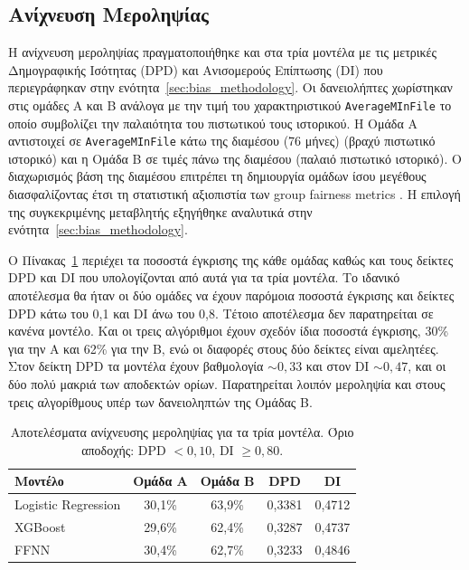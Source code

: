 \subsection{Ανίχνευση Μεροληψίας}
\label{subsec:bias_detection}

Η ανίχνευση μεροληψίας πραγματοποιήθηκε και στα τρία μοντέλα με τις μετρικές
Δημογραφικής Ισότητας (DPD) και Ανισομερούς Επίπτωσης (DI) που περιεγράφηκαν
στην ενότητα~\ref{sec:bias_methodology}. Οι δανειολήπτες χωρίστηκαν στις ομάδες Α και Β
ανάλογα με την τιμή του χαρακτηριστικού \texttt{AverageMInFile} το οποίο
συμβολίζει την παλαιότητα του πιστωτικού τους ιστορικού. Η Ομάδα Α αντιστοιχεί
σε \texttt{AverageMInFile} κάτω της διαμέσου (76 μήνες) (βραχύ πιστωτικό
ιστορικό) και η Ομάδα Β σε τιμές πάνω της διαμέσου (παλαιό πιστωτικό ιστορικό). Ο διαχωρισμός βάση της διαμέσου 
επιτρέπει τη δημιουργία ομάδων ίσου μεγέθους διασφαλίζοντας έτσι τη στατιστική αξιοπιστία των group fairness metrics \citep{barocas2019fairness}.
Η επιλογή της συγκεκριμένης μεταβλητής εξηγήθηκε αναλυτικά στην
ενότητα~\ref{sec:bias_methodology}.

Ο Πίνακας~\ref{tab:bias_results} περιέχει τα ποσοστά έγκρισης της κάθε ομάδας
καθώς και τους δείκτες DPD και DI που υπολογίζονται από αυτά για τα τρία μοντέλα.
Το ιδανικό αποτέλεσμα θα ήταν οι δύο ομάδες να έχουν παρόμοια ποσοστά έγκρισης
και δείκτες DPD κάτω του 0{,}1 και DI άνω του 0{,}8. Τέτοιο αποτέλεσμα δεν
παρατηρείται σε κανένα μοντέλο. Και οι τρεις αλγόριθμοι έχουν σχεδόν ίδια
ποσοστά έγκρισης, 30\% για την Α και 62\% για την Β, ενώ οι διαφορές στους
δύο δείκτες είναι αμελητέες. Στον δείκτη DPD τα μοντέλα έχουν βαθμολογία
${\sim}0{,}33$ και στον DI ${\sim}0{,}47$, και οι δύο πολύ μακριά των αποδεκτών
ορίων. Παρατηρείται λοιπόν μεροληψία και στους τρεις αλγορίθμους υπέρ των
δανειοληπτών της Ομάδας Β.

\begin{table}[htbp]
    \centering
    \caption[Αποτελέσματα ανίχνευσης μεροληψίας]{Αποτελέσματα ανίχνευσης μεροληψίας για τα τρία μοντέλα.
    Όριο αποδοχής: DPD $< 0{,}10$, DI $\geq 0{,}80$.}
    \label{tab:bias_results}
    \begin{tabular}{lcccc}
        \toprule
        \textbf{Μοντέλο} & \textbf{Ομάδα Α} & \textbf{Ομάδα Β}
        & \textbf{DPD} & \textbf{DI} \\
        \midrule
        Logistic Regression & 30{,}1\% & 63{,}9\% & 0{,}3381 & 0{,}4712 \\
        XGBoost             & 29{,}6\% & 62{,}4\% & 0{,}3287 & 0{,}4737 \\
        FFNN                & 30{,}4\% & 62{,}7\% & 0{,}3233 & 0{,}4846 \\
        \bottomrule
    \end{tabular}
\end{table}

